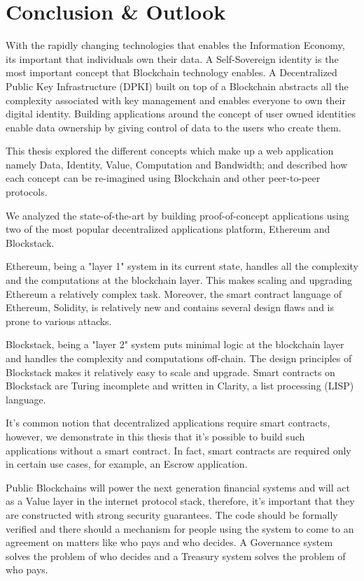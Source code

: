 \chapter{Conclusion \& Outlook}\label{chapter::conclusion}
	With the rapidly changing technologies that enables the Information Economy, its important that individuals own their data. A Self-Sovereign identity is the most important concept that Blockchain technology enables. A Decentralized Public Key Infrastructure (DPKI) built on top of a Blockchain abstracts all the complexity associated with key management and enables everyone to own their digital identity. Building applications around the concept of user owned identities enable data ownership by giving control of data to the users who create them.
	
	This thesis explored the different concepts which make up a web application namely Data, Identity, Value, Computation and Bandwidth; and described how each concept can be re-imagined using Blockchain and other peer-to-peer protocols.
	
	We analyzed the state-of-the-art by building proof-of-concept applications using two of the most popular decentralized applications platform, Ethereum and Blockstack. 
	
	Ethereum, being a "layer 1" system in its current state, handles all the complexity and the computations at the blockchain layer. This makes scaling and upgrading Ethereum a relatively complex task. Moreover, the smart contract language of Ethereum, Solidity, is relatively new and contains several design flaws and is prone to various attacks.
	
	Blockstack, being a "layer 2" system puts minimal logic at the blockchain layer and handles the complexity and computations off-chain. The design principles of Blockstack makes it relatively easy to scale and upgrade. Smart contracts on Blockstack are Turing incomplete and written in Clarity, a list processing (LISP) language.
	
	It's common notion that decentralized applications require smart contracts, however, we demonstrate in this thesis that it's possible to build such applications without a smart contract. In fact, smart contracts are required only in certain use cases, for example, an Escrow application.
	
	Public Blockchains will power the next generation financial systems and will act as a Value layer in the internet protocol stack, therefore, it's important that they are constructed with strong security guarantees. The code should be formally verified and there should a mechanism for people using the system to come to an agreement on matters like who pays and who decides. A Governance system solves the problem of who decides and a Treasury system solves the problem of who pays.
	
